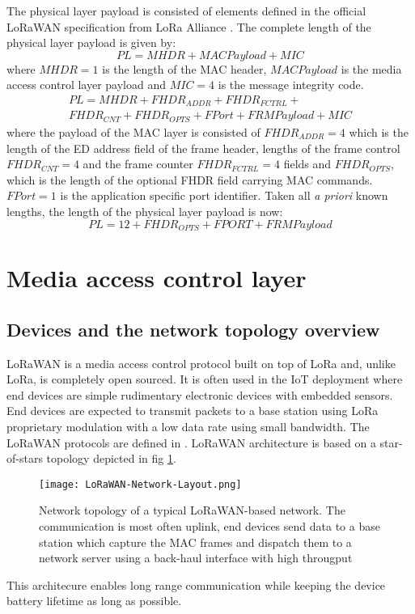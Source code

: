 The physical layer payload is consisted of elements defined in the official LoRaWAN specification from LoRa Alliance \cite{Sornin_LoRaWAN}.
The complete length of the physical layer payload is given by:
\begin{equation}
    PL = MHDR + MACPayload + MIC 
\end{equation}
where $MHDR=1$ is the length of the MAC header, $MACPayload$ is the media access control layer payload and $MIC=4$ is the message integrity code.
\begin{multline}
    PL = MHDR + FHDR_{ADDR} + FHDR_{FCTRL} +\\ FHDR_{CNT} + FHDR_{OPTS} + FPort + FRMPayload + MIC 
\end{multline}
where the payload of the MAC layer is consisted of $FHDR_{ADDR}=4$ which is the length of the ED address field of the frame header, lengths of the frame control $FHDR_{CNT}=4$ and the frame counter $FHDR_{FCTRL}=4$ fields and $FHDR_{OPTS}$, which is the length of the optional FHDR field carrying MAC commands.
$FPort=1$ is the application specific port identifier.
Taken all \textit{a priori} known lengths, the length of the physical layer payload is now:
\begin{equation}
    PL = 12 + FHDR_{OPTS} + FPORT + FRMPayload
\end{equation}

\section{Media access control layer}
\subsection{Devices and the network topology overview}
LoRaWAN is a media access control protocol built on top of LoRa and, unlike LoRa, is completely open sourced.
It is often used in the IoT deployment where end devices are simple rudimentary electronic devices with embedded sensors. 
End devices are expected to transmit packets to a base station using LoRa proprietary modulation with a low data rate using small bandwidth.
The LoRaWAN protocols are defined in \cite{Sornin_LoRaWAN}.
LoRaWAN architecture is based on a star-of-stars topology depicted in fig \ref{fig:lorawan}.
\begin{figure}[h]
    \centering
    \texttt{[image: LoRaWAN-Network-Layout.png]}
    \caption{Network topology of a typical LoRaWAN-based network. The communication is most often uplink, end devices send data to a base station which capture the MAC frames and dispatch them to a network server using a back-haul interface with high througput}
    \label{fig:lorawan}
\end{figure}
This architecure enables long range communication while keeping the device battery lifetime as long as possible.

